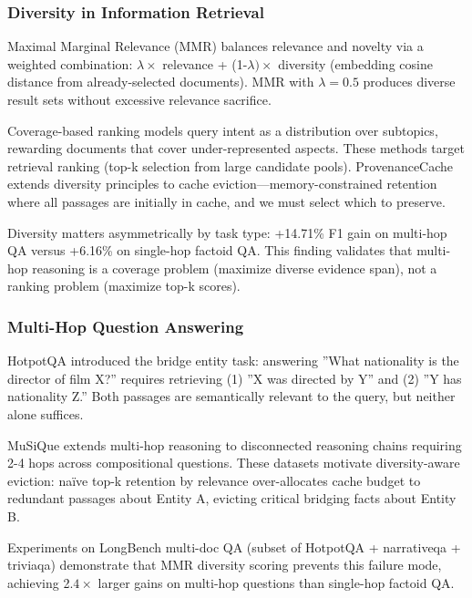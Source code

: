 \subsubsection{Diversity in Information Retrieval}

Maximal Marginal Relevance (MMR) \citep{carbonell1998mmr} balances relevance and novelty via a weighted combination: $\lambda \times$ relevance + (1-$\lambda ) \times$ diversity (embedding cosine distance from already-selected documents). MMR with $\lambda =0.5$ produces diverse result sets without excessive relevance sacrifice.

Coverage-based ranking \citep{clarke2008novelty} models query intent as a distribution over subtopics, rewarding documents that cover under-represented aspects. These methods target retrieval ranking (top-k selection from large candidate pools). ProvenanceCache extends diversity principles to cache eviction---memory-constrained retention where all passages are initially in cache, and we must select which to preserve.

Diversity matters asymmetrically by task type: +14.71\% F1 gain on multi-hop QA versus +6.16\% on single-hop factoid QA. This finding validates that multi-hop reasoning is a coverage problem (maximize diverse evidence span), not a ranking problem (maximize top-k scores).

\subsubsection{Multi-Hop Question Answering}

HotpotQA \citep{yang2018hotpotqa} introduced the bridge entity task: answering ''What nationality is the director of film X?'' requires retrieving (1) ''X was directed by Y'' and (2) ''Y has nationality Z.'' Both passages are semantically relevant to the query, but neither alone suffices.

MuSiQue \citep{trivedi2022musique} extends multi-hop reasoning to disconnected reasoning chains requiring 2-4 hops across compositional questions. These datasets motivate diversity-aware eviction: naïve top-k retention by relevance over-allocates cache budget to redundant passages about Entity A, evicting critical bridging facts about Entity B.

Experiments on LongBench multi-doc QA (subset of HotpotQA + narrativeqa + triviaqa) demonstrate that MMR diversity scoring prevents this failure mode, achieving 2.$4\times$ larger gains on multi-hop questions than single-hop factoid QA.

